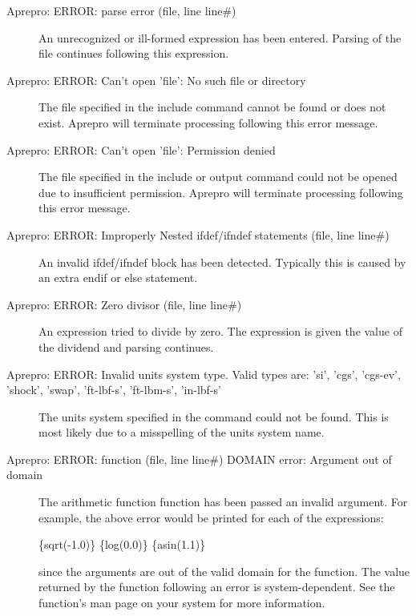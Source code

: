 \begin{description}
\item[Aprepro:  ERROR:  parse  error  (file,  line  line\#)]
An unrecognized or ill-formed expression has been entered. Parsing of
the file continues following this expression.

\item[Aprepro: ERROR: Can't open 'file': No such file or directory] The file specified
in the include command cannot be found or does not exist. Aprepro will terminate
processing following this error message.

\item[Aprepro: ERROR: Can't open 'file': Permission denied] The file specified in the
include or output command could not be opened due to insufficient permission.
Aprepro will terminate processing following this error message.

\item[Aprepro: ERROR: Improperly Nested ifdef/ifndef statements (file, line line\#)]
An invalid ifdef/ifndef block has been detected. Typically this is caused by an
extra endif or else statement.

\item[Aprepro:  ERROR:    Zero  divisor  (file,  line  line\#)]    An expression tried
to divide by zero. The expression is given the value of the dividend and parsing continues.

\item[Aprepro: ERROR: Invalid units system type. Valid types are: 'si', 'cgs', 'cgs-ev', 'shock', 'swap', 'ft-lbf-s', 'ft-lbm-s', 'in-lbf-s']
The units system specified in the command could not be found. This
is most likely due to a misspelling of the units system name.

\item[Aprepro: ERROR: function (file, line line\#) DOMAIN error: Argument out of domain]
The arithmetic function function has been passed an invalid
argument. For example, the above error would be printed for each of
the expressions:
\begin{apinp}
\{sqrt(-1.0)\}  \{log(0.0)\}  \{asin(1.1)\}
\end{apinp}

since the arguments are out of the valid domain for the function. The
value returned by the function following an error is
system-dependent. See the function's man page on your system for more
information.


\end{description}

